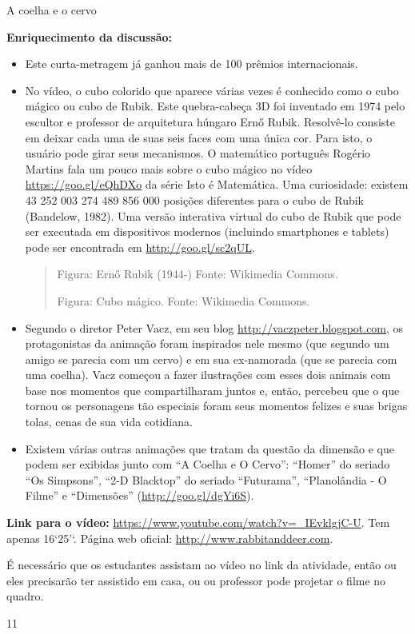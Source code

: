 \begin{sugestions}{A coelha e o cervo}
{
\textbf{Enriquecimento da discussão:}
\begin{itemize}
\item {} 
Este curta-metragem já ganhou mais de 100 prêmios internacionais.

\item {} 
No vídeo, o cubo colorido que aparece várias vezes é conhecido como o cubo mágico ou cubo de Rubik. Este quebra-cabeça 3D foi inventado em 1974 pelo escultor e professor de arquitetura húngaro Ernő Rubik. Resolvê-lo consiste em deixar cada uma de suas seis faces com uma única cor. Para isto, o usuário pode girar seus mecanismos. O matemático português Rogério Martins fala um pouco mais sobre o cubo mágico no vídeo \url{https://goo.gl/eQhDXo} da série Isto é Matemática. Uma curiosidade: existem  43 252 003 274 489 856 000 posições diferentes para o cubo de Rubik (Bandelow, 1982). Uma versão interativa virtual do cubo de Rubik que pode ser executada em dispositivos modernos (incluindo smartphones e tablets) pode ser encontrada em \url{http://goo.gl/sc2qUL}.
\begin{quote}

Figura: Ernő Rubik (1944-)
Fonte: Wikimedia Commons.

Figura: Cubo mágico.
Fonte: Wikimedia Commons.
\end{quote}

\item {} 
Segundo o diretor Peter Vacz, em seu blog \url{http://vaczpeter.blogspot.com}, os protagonistas da animação foram inspirados nele mesmo (que segundo um amigo se parecia com um cervo) e em sua ex-namorada (que se parecia com uma coelha). Vacz começou a fazer ilustrações com esses dois animais com base nos momentos que compartilharam juntos e, então, percebeu que o que tornou os personagens tão especiais foram seus momentos felizes e suas brigas tolas, cenas de sua vida cotidiana.

\item {} 
Existem várias outras animações que tratam da questão da dimensão e que podem ser exibidas junto com “A Coelha e O Cervo”:  “Homer” do seriado “Os Simpsons”,   “2-D Blacktop” do seriado “Futurama”, “Planolândia  - O Filme”  e  “Dimensões” (\url{http://goo.gl/dgYi6S}).

\end{itemize}

\textbf{Link para o vídeo:} \url{https://www.youtube.com/watch?v=\_IEvklgjC-U}. Tem apenas 16‘25’‘. Página web oficial: \url{http://www.rabbitanddeer.com}.

É necessário que os estudantes assistam ao vídeo no link da atividade, então ou eles precisarão ter assistido em casa, ou ou professor pode projetar o filme no quadro.
}{1}{1}
\end{sugestions}

